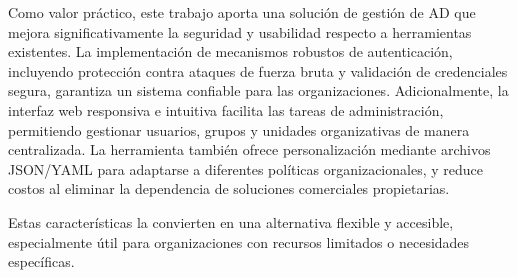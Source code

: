 Como valor práctico, este trabajo aporta una solución de gestión de AD que mejora significativamente la seguridad y usabilidad respecto a herramientas existentes. La implementación de mecanismos robustos de autenticación, incluyendo protección contra ataques de fuerza bruta y validación de credenciales segura, garantiza un sistema confiable para las organizaciones. Adicionalmente, la interfaz web responsiva e intuitiva facilita las tareas de administración, permitiendo gestionar usuarios, grupos y unidades organizativas de manera centralizada. La herramienta también ofrece personalización mediante archivos JSON/YAML para adaptarse a diferentes políticas organizacionales, y reduce costos al eliminar la dependencia de soluciones comerciales propietarias.

Estas características la convierten en una alternativa flexible y accesible, especialmente útil para organizaciones con recursos limitados o necesidades específicas.
